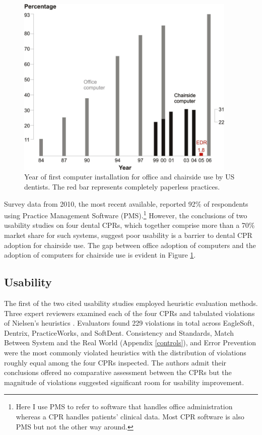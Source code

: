 \documentclass[11pt]{article}
\begin{document}
\begin{figure}[h!]
\begin{center}
\includegraphics[width=105mm]{comp.png}
\end{center}
\caption{Year of first computer installation for office and chairside use by US dentists. The red bar represents completely paperless practices.}
\label{adoption}
\end{figure} 
\newpage

\noindent Survey data from 2010, the most recent available, reported 92\% of respondents using Practice Management Software (PMS)\cite{Levine2010}.\footnote[2]{Here I use PMS to refer to software that handles office administration whereas a CPR handles patients' clinical data. Most CPR software is also PMS but not the other way around.} However, the conclusions of two usability studies on four dental CPRs, which together comprise more than a 70\% market share for such systems, suggest poor usability is a barrier to dental CPR adoption for chairside use\cite{Thyvalikakath2007Heuristic-evalu,Thyvalikakath2008A-usability-eva}. The gap between office adoption of computers and the adoption of computers for chairside use is evident in Figure \ref{adoption}.

\subsection{Usability}
The first of the two cited usability studies employed heuristic evaluation methods\cite{Nielsen1994Usability-Inspe, Schleyer:2007fk}. Three expert reviewers examined each of the four CPRs and tabulated violations of Nielsen's heuristics \cite{Thyvalikakath:2009fk}. Evaluators found 229 violations in total across EagleSoft, Dentrix, PracticeWorks, and SoftDent. Consistency and Standards, Match Between System and the Real World (Appendix \ref{controls}), and Error Prevention were the most commonly violated heuristics  with the distribution of violations roughly equal among the four CPRs inspected. The authors admit their conclusions offered no comparative assessment between the CPRs but the magnitude of violations suggested significant room for usability improvement.
\end{document}

